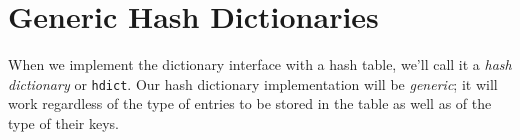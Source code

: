 







\section{Generic Hash Dictionaries}
\label{sec:hdict:generic_hash_dicts}

When we implement the dictionary interface with a hash table, we'll
call it a \emph{hash dictionary} or \lstinline'hdict'.  Our hash
dictionary implementation will be \emph{generic}; it will work
regardless of the type of entries to be stored in the table as well as
of the type of their keys.

